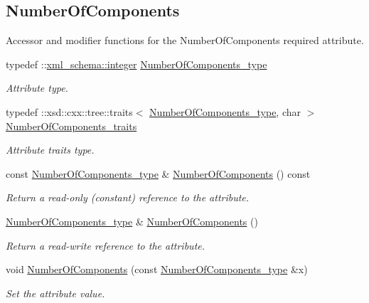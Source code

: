 \subsection*{Number\+Of\+Components}
\label{_amgrp2a0e258c3f78050b74e96bb0ed643748}%
Accessor and modifier functions for the Number\+Of\+Components required attribute. \begin{DoxyCompactItemize}
\item 
typedef \+::\hyperlink{namespacexml__schema_aaaea7c8ce4dfbe26cc52c91c29c97b7c}{xml\+\_\+schema\+::integer} \hyperlink{classDataArray__t_aac602cec132f6e771f7fa3be1d19c16f}{Number\+Of\+Components\+\_\+type}
\begin{DoxyCompactList}\small\item\em Attribute type. \end{DoxyCompactList}\item 
typedef \+::xsd\+::cxx\+::tree\+::traits$<$ \hyperlink{classDataArray__t_aac602cec132f6e771f7fa3be1d19c16f}{Number\+Of\+Components\+\_\+type}, char $>$ \hyperlink{classDataArray__t_a1112148f87db2c0ba05323377d9f0427}{Number\+Of\+Components\+\_\+traits}
\begin{DoxyCompactList}\small\item\em Attribute traits type. \end{DoxyCompactList}\item 
const \hyperlink{classDataArray__t_aac602cec132f6e771f7fa3be1d19c16f}{Number\+Of\+Components\+\_\+type} \& \hyperlink{classDataArray__t_a715a5b58a694d49499591bfea3a282ae}{Number\+Of\+Components} () const 
\begin{DoxyCompactList}\small\item\em Return a read-\/only (constant) reference to the attribute. \end{DoxyCompactList}\item 
\hyperlink{classDataArray__t_aac602cec132f6e771f7fa3be1d19c16f}{Number\+Of\+Components\+\_\+type} \& \hyperlink{classDataArray__t_a6f80fc5ce05d51d4292c698464d4ace3}{Number\+Of\+Components} ()
\begin{DoxyCompactList}\small\item\em Return a read-\/write reference to the attribute. \end{DoxyCompactList}\item 
void \hyperlink{classDataArray__t_a755fae9b31318f98a3d21beba16f2841}{Number\+Of\+Components} (const \hyperlink{classDataArray__t_aac602cec132f6e771f7fa3be1d19c16f}{Number\+Of\+Components\+\_\+type} \&x)
\begin{DoxyCompactList}\small\item\em Set the attribute value. \end{DoxyCompactList}\end{DoxyCompactItemize}
